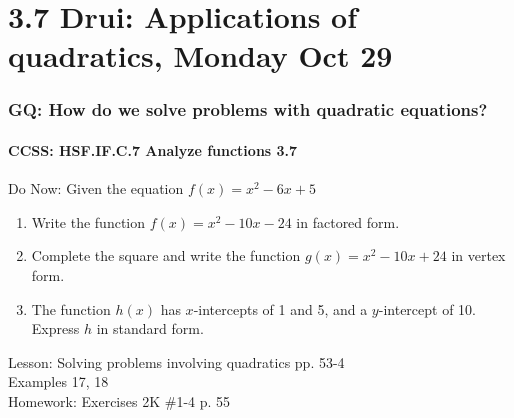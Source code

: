 \documentclass{beamer}
\begin{document}
\section{3.7 Drui: Applications of quadratics, Monday Oct 29}
  \frame
  {
    \frametitle{GQ: How do we solve problems with quadratic equations?}
    \framesubtitle{CCSS: HSF.IF.C.7 Analyze functions    \alert{3.7}}

    \begin{block}{Do Now: Given the equation $f(x)=x^2-6x+5$}
      \begin{enumerate}
          \item Write the function $f(x)=x^2-10x-24$ in factored form.
          \item Complete the square and write the function $g(x)=x^2-10x+24$ in vertex form.
          \item The function $h(x)$ has $x$-intercepts of 1 and 5, and a $y$-intercept of 10. Express $h$ in standard form.
      \end{enumerate}
    \end{block}
    Lesson: Solving problems involving quadratics pp. 53-4 \\
    Examples 17, 18\\ \bigskip
    Homework: Exercises 2K \#1-4 p. 55
  }
\end{document}
